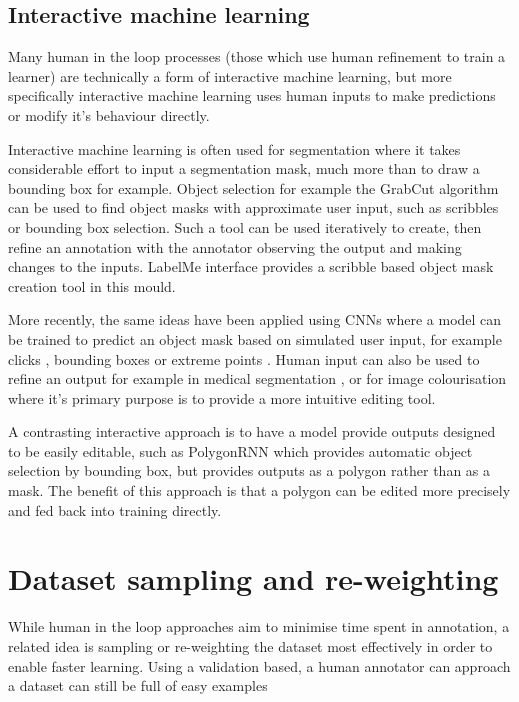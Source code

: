 \subsection{Interactive machine learning}

Many human in the loop processes (those which use human refinement to train a learner) are technically a form of interactive machine learning, but more specifically interactive machine learning uses human inputs to make predictions or modify it's behaviour directly.

Interactive machine learning is often used for segmentation where it takes considerable effort to input a segmentation mask, much more than to draw a bounding box for example. Object selection for example the GrabCut algorithm \cite{Rother} can be used to find object masks with approximate user input, such as scribbles or bounding box selection. Such a tool can be used iteratively to create, then refine an annotation with the annotator observing the output and making changes to the inputs.  LabelMe \cite{Russell2007} interface provides a scribble based object mask creation tool in this mould. 

More recently, the same ideas have been applied using \gls{CNN}s where a model can be trained to predict an object mask based on simulated user input, for example clicks \cite{Xu2016b, Boroujerdi2017}, bounding boxes \cite {Xu2017a} or extreme points \cite{Maninis2017}. Human input can also be used to refine an output for example in medical segmentation \cite{Wang2017}, or for image colourisation \cite{Zhang} where it's primary purpose is to provide a more intuitive editing tool.

A contrasting interactive approach is to have a model provide outputs designed to be easily editable, such as PolygonRNN \cite{Castrejon2017} which provides automatic object selection by bounding box, but provides outputs as a polygon rather than as a mask. The benefit of this approach is that a polygon can be edited more precisely and fed back into training directly.


\section{Dataset sampling and re-weighting}
 
While human in the loop approaches aim to minimise time spent in annotation, a related idea is sampling or re-weighting the dataset most effectively in order to enable faster learning. Using a validation based, a human annotator can  approach a dataset can still be full of easy examples

